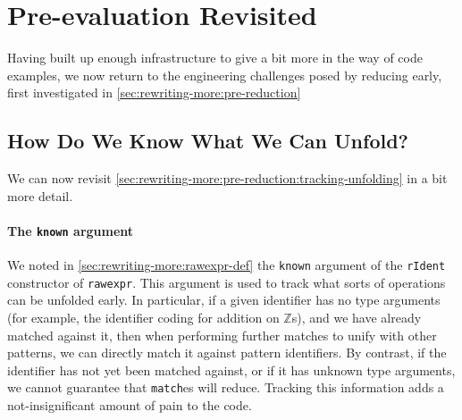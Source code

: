 \section{Pre-evaluation Revisited}\label{sec:rewriting-more:pre-reduction-again}

Having built up enough infrastructure to give a bit more in the way of code examples, we now return to the engineering challenges posed by reducing early, first investigated in \autoref{sec:rewriting-more:pre-reduction}


\subsection{How Do We Know What We Can Unfold?}\label{sec:rewriting-more:pre-reduction-again:tracking-unfolding}
We can now revisit \autoref{sec:rewriting-more:pre-reduction:tracking-unfolding} in a bit more detail.

\paragraph{The \texttt{known} argument}\label{sec:rewriting-more:rIdent-known}
We noted in \autoref{sec:rewriting-more:rawexpr-def} the \texttt{known} argument of the \texttt{rIdent} constructor of \texttt{rawexpr}.
This argument is used to track what sorts of operations can be unfolded early.
In particular, if a given identifier has no type arguments (for example, the identifier coding for addition on $\mathbb{Z}$s), and we have already matched against it, then when performing further matches to unify with other patterns, we can directly match it against pattern identifiers.
By contrast, if the identifier has not yet been matched against, or if it has unknown type arguments, we cannot guarantee that \texttt{match}es will reduce.
Tracking this information adds a not-insignificant amount of pain to the code.

